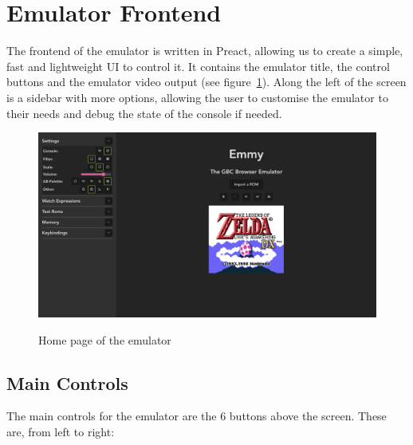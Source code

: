 \documentclass[11pt]{informatics-report}
\begin{document}
\section{Emulator Frontend}

The frontend of the emulator is written in Preact, allowing us to create a simple, fast and lightweight UI to control it. It contains the emulator title, the control buttons and the emulator video output (see figure~\ref{fig:emmy-home}). Along the left of the screen is a sidebar with more options, allowing the user to customise the emulator to their needs and debug the state of the console if needed.

\begin{figure}[h]
    \centering
    \includegraphics[width=15cm]{images/emmy-home-page}\\
    \caption{Home page of the emulator}
    \label{fig:emmy-home}
\end{figure}

\subsection{Main Controls}

The main controls for the emulator are the 6 buttons above the screen. These are, from left to right:
\end{document}
